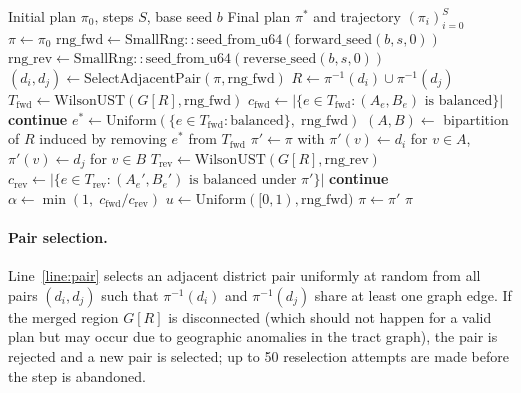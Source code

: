 \begin{algorithm}
\caption{\fr{} Chain}
\label{alg:fr}
\begin{algorithmic}[1]
\Require Initial plan $\pi_0$, steps $S$, base seed $b$
\Ensure  Final plan $\pi^*$ and trajectory $(\pi_i)_{i=0}^{S}$
\State $\pi \gets \pi_0$
  \State $\mathrm{rng\_fwd} \gets \mathrm{SmallRng::seed\_from\_u64}(\mathrm{forward\_seed}(b, s, 0))$
  \State $\mathrm{rng\_rev} \gets \mathrm{SmallRng::seed\_from\_u64}(\mathrm{reverse\_seed}(b, s, 0))$
  \State {}
  \State $(d_i, d_j) \gets \mathrm{SelectAdjacentPair}(\pi, \mathrm{rng\_fwd})$
        \label{line:pair}
  \State $R \gets \pi^{-1}(d_i) \cup \pi^{-1}(d_j)$
  \State {}
  \State $T_{\mathrm{fwd}} \gets \mathrm{WilsonUST}(G[R], \mathrm{rng\_fwd})$
  \State $c_{\mathrm{fwd}} \gets |\{e \in T_{\mathrm{fwd}} : (A_e, B_e) \text{ is balanced}\}|$
   \textbf{continue} \EndIf
  \State $e^* \gets \mathrm{Uniform}(\{e \in T_{\mathrm{fwd}} : \text{balanced}\},\;
          \mathrm{rng\_fwd})$
  \State $(A, B) \gets $ bipartition of $R$ induced by removing $e^*$ from $T_{\mathrm{fwd}}$
  \State $\pi' \gets \pi$ with $\pi'(v) \gets d_i$ for $v \in A$,\;
         $\pi'(v) \gets d_j$ for $v \in B$
  \State {}
  \State $T_{\mathrm{rev}} \gets \mathrm{WilsonUST}(G[R], \mathrm{rng\_rev})$
  \State $c_{\mathrm{rev}} \gets |\{e \in T_{\mathrm{rev}} : (A_e', B_e') \text{ is balanced under } \pi'\}|$
   \textbf{continue} \EndIf
  \State $\alpha \gets \min\!\left(1,\; c_{\mathrm{fwd}} / c_{\mathrm{rev}}\right)$
  \State $u \gets \mathrm{Uniform}([0,1), \mathrm{rng\_fwd})$
    \State $\pi \gets \pi'$
  \EndIf
\EndFor
\State \Return $\pi$
\end{algorithmic}
\end{algorithm}

\paragraph{Pair selection.}
Line~\ref{line:pair} selects an adjacent district pair uniformly at random
from all pairs $(d_i, d_j)$ such that $\pi^{-1}(d_i)$ and $\pi^{-1}(d_j)$
share at least one graph edge.
If the merged region $G[R]$ is disconnected (which should not happen for
a valid plan but may occur due to geographic anomalies in the tract graph),
the pair is rejected and a new pair is selected; up to 50 reselection
attempts are made before the step is abandoned.

